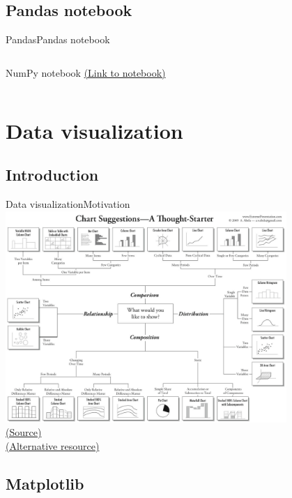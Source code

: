 \documentclass[10pt,compress]{beamer} %
\begin{document}
\subsection{Pandas notebook}
\begin{frame}{Pandas}{Pandas notebook}
    \begin{columns}
			\begin{block}{NumPy notebook}
			\href{https://github.com/dfbarrero/dataCourse/blob/master/pandas/Pandas.ipynb}{(Link to notebook)}
			\end{block}
	\end{columns}
\end{frame}

\section{Data visualization}
\subsection{Introduction}

\begin{frame}[plain]{Data visualization}{Motivation}
	\centering \includegraphics[width=0.8\textwidth]{figs/chart-selection-diagram.png}\\
	\centering \tiny \href{https://flex.bi/create-beautiful-dashboard-works/}{(Source)}\\
	\href{http://experception.net/Franconeri_ExperCeptionDotNet_ChartChooser.pdf}{(Alternative resource)}
\end{frame}


\subsection{Matplotlib}
\end{document}
